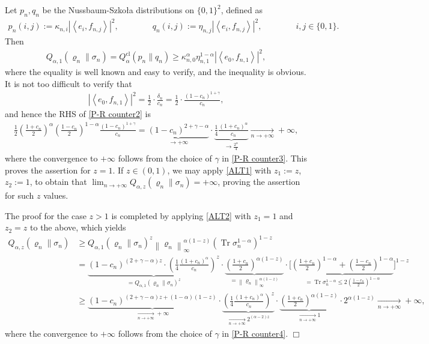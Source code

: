 \documentclass[unsortedaddress,superscriptaddress,pra,notitlepage]{revtex4}
\newenvironment{proof}[1][Proof]{\begin{trivlist}
\item[\hskip \labelsep {\bfseries #1}]}{\hfill$\Box$\end{trivlist}}
\def\rho{\varrho}
\def\half{\frac{1}{2}}
\def\bz{\left(}
\def\jz{\right)}
\def\cl{\mathrm{cl}}
\def\cl{\mathrm{cl}}
\newcommand{\ds}{\mbox{ }\mbox{ }}
\newcommand{\norm}[1]{\left\| #1\right\|}
\newcommand{\inner}[2]{\left\langle #1 , #2\right\rangle}
\DeclareMathOperator{\Tr}{Tr}
\begin{document}
\begin{proof}
Let $p_n,q_n$ be the Nussbaum-Szko\l a distributions \cite{NSz} on $\{0,1\}^2$, defined as
\begin{align*}
p_n(i,j):=\kappa_{n,i}|\inner{e_i}{f_{n,j}}|^2,\ds\ds\ds
q_n(i,j):=\eta_{n,j}|\inner{e_i}{f_{n,j}}|^2,\ds\ds\ds
i,j\in\{0,1\}.
\end{align*}
Then
\begin{align}
Q_{\alpha,1}(\rho_n\|\sigma_n)=Q_{\alpha}^{\cl}(p_n\|q_n)
\ge
\kappa_{n,0}^{\alpha}\eta_{n,1}^{1-\alpha}|\inner{e_0}{f_{n,1}}|^2,
\label{P-R counter2}
\end{align}
where the equality is well known and easy to verify, and the inequality is obvious.
It is not too difficult to verify that 
\begin{align*}
|\inner{e_0}{f_{n,1}}|^2=\frac{1}{2}\cdot\frac{\delta_n}{c_n}=\frac{1}{2}\cdot\frac{(1-c_n)^{1+\gamma}}{c_n},
\end{align*}
and hence the RHS of \eqref{P-R counter2} is
\begin{align*}
\half\bz\frac{1+c_n}{2}\jz^{\alpha}\bz\frac{1-c_n}{2}\jz^{1-\alpha}\frac{(1-c_n)^{1+\gamma}}{c_n}
=
\underbrace{(1-c_n)^{2+\gamma-\alpha}}_{\to +\infty}\cdot\underbrace{\frac{1}{4}\frac{(1+c_n)^{\alpha}}{c_n}}_{\to \frac{2^{\alpha}}{4}}
\xrightarrow[n\to+\infty]{}+\infty,
\end{align*}
where the convergence to $+\infty$ follows from the choice of $\gamma$ in \eqref{P-R counter3}. This proves the assertion for $z=1$. 
If $z\in(0,1)$, we may apply 
\eqref{ALT1} with $z_1:=z$, $z_2:=1$, to obtain that 
$\lim_{n\to+\infty}Q_{\alpha,z}(\rho_n\|\sigma_n)=+\infty$, proving the assertion for such $z$ values.

The proof for the case $z>1$ is completed by applying \eqref{ALT2}
with $z_1=1$ and $z_2=z$ to the above, which yields
\begin{align*}
Q_{\alpha,z}(\rho_n\|\sigma_n)
&\ge 
Q_{\alpha,1}(\rho_n\|\sigma_n)^z\norm{\rho_n}_{\infty}^{\alpha(1-z)}
\bz\Tr\sigma_n^{1-\alpha}\jz^{1-z}\\
&=
\underbrace{(1-c_n)^{(2+\gamma-\alpha)z}\cdot\bz\frac{1}{4}\frac{(1+c_n)^{\alpha}}{c_n}\jz^z}_{=Q_{\alpha,1}(\rho_n\|\sigma_n)^z}
\cdot\underbrace{\bz\frac{1+c_n}{2}\jz^{\alpha(1-z)}}_{=\norm{\rho_n}_{\infty}^{\alpha(1-z)}}
\cdot
\Bigg[
\underbrace{\bz\frac{1+c_n}{2}\jz^{1-\alpha}+\bz\frac{1-c_n}{2}\jz^{1-\alpha}
}_{=\Tr\sigma_n^{1-\alpha}\le 2\bz\frac{1-c_n}{2}\jz^{1-\alpha}}
\Bigg]^{1-z}
\\
&\ge 
\underbrace{(1-c_n)^{(2+\gamma-\alpha)z+(1-\alpha)(1-z)}}_{\xrightarrow[n\to +\infty]{}+\infty}
\cdot
\underbrace{\bz\frac{1}{4}\frac{(1+c_n)^{\alpha}}{c_n}\jz^z}_{\xrightarrow[n\to +\infty]{} 2^{(\alpha-2)z}}
\cdot
\underbrace{\bz\frac{1+c_n}{2}\jz^{\alpha(1-z)}}_{\xrightarrow[n\to +\infty]{} 1}
\cdot 2^{\alpha(1-z)}
\xrightarrow[n\to+\infty]{}+\infty,
\end{align*}
where the convergence to $+\infty$ follows
from the choice of $\gamma$ in \eqref{P-R counter4}.
\end{proof}
\end{document}
